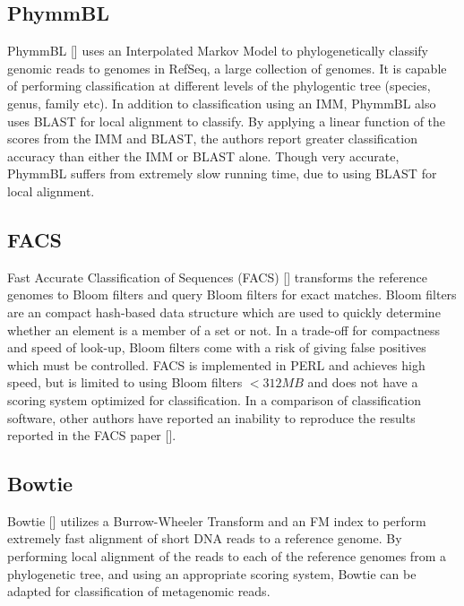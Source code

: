 \documentclass[12pt]{article} %
\begin{document}
\subsection{PhymmBL}
PhymmBL [\cite{Brady:2009dg}] uses an Interpolated Markov Model to phylogenetically classify genomic reads to genomes in RefSeq, a large collection of genomes. It is capable of performing classification at different levels of the phylogentic tree (species, genus, family etc). In addition to classification using an IMM, PhymmBL also uses BLAST for local alignment to classify. By applying a linear function of the scores from the IMM and BLAST, the authors report greater classification accuracy than either the IMM or BLAST alone. Though very accurate, PhymmBL suffers from extremely slow running time, due to using BLAST for local alignment. 

\subsection{FACS}
Fast Accurate Classification of Sequences (FACS) [\cite{Stranneheim:2010dg}] transforms the reference genomes to Bloom filters and query Bloom filters for exact matches. Bloom filters are an compact hash-based data structure which are used to quickly determine whether an element is a member of a set or not. In a trade-off for compactness and speed of look-up, Bloom filters come with a risk of giving false positives which must be controlled. FACS is implemented in PERL and achieves high speed, but is limited to using Bloom filters $<312 MB$ and does not have a scoring system optimized for classification. In a comparison of classification software, other authors have reported an inability to reproduce the results reported in the FACS paper [\cite{Bazinet:2012dg}].

\subsection{Bowtie}
Bowtie [\cite{Langmead:2009dg}] utilizes a Burrow-Wheeler Transform and an FM index to perform extremely fast alignment of short DNA reads to a reference genome. By performing local alignment of the reads to each of the reference genomes from a phylogenetic tree, and using an appropriate scoring system, Bowtie can be adapted for classification of metagenomic reads. 
\end{document}
